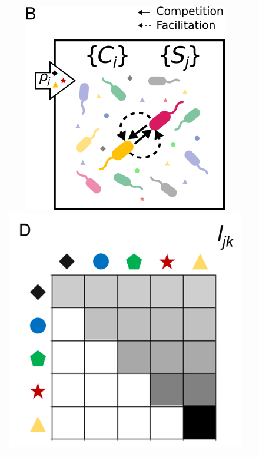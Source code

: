 \documentclass[11pt, a4paper]{article}
\begin{document}
\begin{spacing}{1.5}
\begin{figure}
    \hfill
    \begin{tabular}{c@{}c@{}}
    \includegraphics[scale=0.53]{./Figures/Community.png}
    \includegraphics[scale=0.29]{./Figures/l.png}
    \end{tabular}

\end{figure}
\end{spacing}
\end{document}
